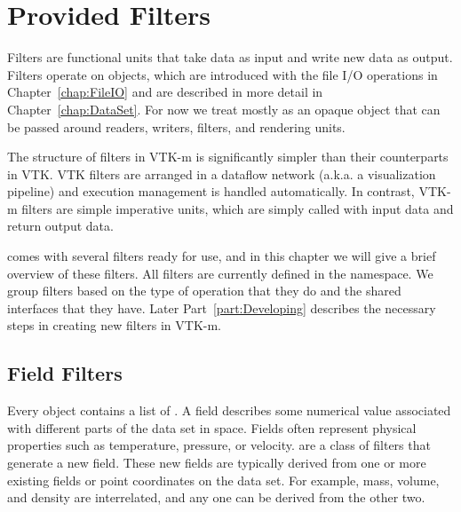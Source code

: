 
\chapter{Provided Filters}
\label{chap:ProvidedFilters}


Filters are functional units that take data as input and write new data as
output. Filters operate on  objects, which are introduced
with the file I/O operations in Chapter~\ref{chap:FileIO} and are described in
more detail in Chapter~\ref{chap:DataSet}. For now we treat
 mostly as an opaque object that can be passed
around readers, writers, filters, and rendering units.

\begin{didyouknow}
  The structure of filters in VTK-m is significantly simpler than their
  counterparts in VTK. VTK filters are arranged in a dataflow network
  (a.k.a. a visualization pipeline) and execution management is handled
  automatically. In contrast, VTK-m filters are simple imperative units,
  which are simply called with input data and return output data.
\end{didyouknow}

\VTKm comes with several filters ready for use, and in this chapter we will give a brief overview of these filters.
All \VTKm filters are currently defined in the \vtkmfilter{} namespace.
We group filters based on the type of operation that they do and the shared interfaces that they have.
Later Part~\ref{part:Developing} describes the necessary steps in creating new filters in VTK-m.


\section{Field Filters}
\label{sec:ProvidedFieldFilters}


Every  object contains a list of 
. A field describes some numerical value associated with
different parts of the data set in space. Fields often represent physical
properties such as temperature, pressure, or velocity.  are a class of filters that generate a new field. These new
fields are typically derived from one or more existing fields or point
coordinates on the data set. For example, mass, volume, and density are
interrelated, and any one can be derived from the other two.

